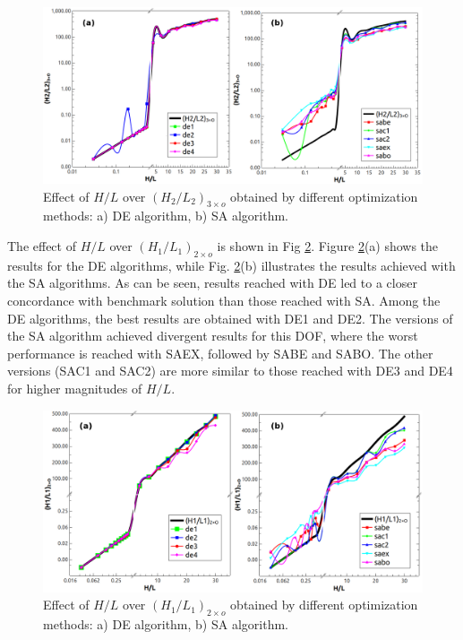 \documentclass[12pt,fleqn]{article}
\begin{document}
\begin{figure}[H]
\centering
\includegraphics[width=0.95\linewidth]{imgs/5dof/de_sa_hl_h2l2.png}
\caption{ {\small Effect of $H/L$ over ${(H_{2}/L_{2})_{3\times o}}$ obtained by different optimization methods: a) DE algorithm, b) SA algorithm.}}
\label{figure06}
\end{figure}


The effect of $H/L$ over ${(H_{1}/L_{1})_{2\times o}}$ is shown in Fig \ref{figure07}. Figure \ref{figure07}(a) shows the results for the DE algorithms, while Fig. \ref{figure07}(b) illustrates the results achieved with the SA algorithms. As can be seen, results reached with DE led to a closer concordance with benchmark solution than those reached with SA. Among the DE algorithms, the best results are obtained with DE1 and DE2. The versions of the SA algorithm achieved divergent results for this DOF, where the worst performance is reached with SAEX, followed by  SABE and SABO. The other versions (SAC1 and SAC2) are more similar to those reached with DE3 and DE4 for higher magnitudes of $H/L$.


\begin{figure}[H]
\centering
\includegraphics[width=0.95\linewidth]{imgs/5dof/de_sa_hl_h1l1.png}
\caption{ {\small Effect of $H/L$ over ${(H_{1}/L_{1})_{2\times o}}$ obtained by different optimization methods: a) DE algorithm, b) SA algorithm.}}
\label{figure07}
\end{figure}
\end{document}
